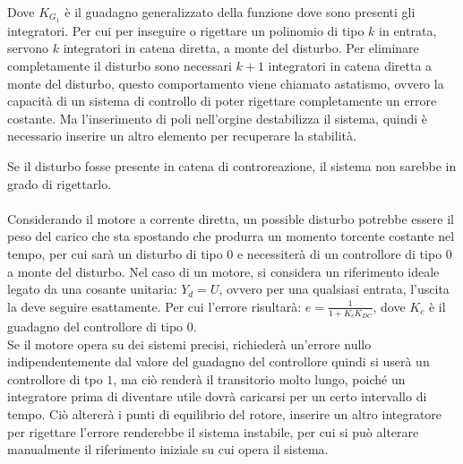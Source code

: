 \documentclass{article}
\numberwithin{equation}{subsection}
\begin{document}
Dove $K_{G_1}$ è il guadagno generalizzato della funzione dove sono presenti gli integratori. 
Per cui per inseguire o rigettare un polinomio di tipo $k$ in entrata, servono $k$ integratori in catena diretta, a monte del disturbo. 
Per eliminare completamente il disturbo sono necessari $k+1$ integratori in catena diretta a monte del disturbo, questo comportamento viene chiamato astatismo, ovvero 
la capacità di un sistema di controllo di poter rigettare completamente un errore costante. Ma l'inserimento di poli nell'orgine 
destabilizza il sistema, quindi è necessario inserire un altro elemento per recuperare la stabilità. 

Se il disturbo fosse presente in catena di controreazione, il sistema non sarebbe in grado di rigettarlo. 
\\
\\
Considerando il motore a corrente diretta, un possible disturbo potrebbe essere il peso del carico che sta spostando che produrra un momento torcente costante nel tempo, 
per cui sarà un disturbo di tipo $0$ e necessiterà di un controllore di tipo $0$ a monte del disturbo. Nel caso di un motore, si considera un riferimento ideale legato da 
una cosante unitaria: $Y_d=U$, ovvero per una qualsiasi entrata, l'uscita la deve seguire esattamente. Per cui l'errore risultarà: $e=\displaystyle\frac{1}{1+K_cK_{DC}}$, 
dove $K_c$ è il guadagno del controllore di tipo $0$. 
\\
Se il motore opera su dei sistemi precisi, richiederà un'errore nullo 
indipendentemente dal valore del guadagno del controllore quindi si userà un controllore di tpo $1$, ma ciò renderà il transitorio molto lungo, poiché un integratore 
prima di diventare utile dovrà caricarsi per un certo intervallo di tempo. Ciò altererà i punti di equilibrio del rotore, inserire un 
altro integratore per rigettare l'errore renderebbe il sistema instabile, per cui si può alterare manualmente il riferimento iniziale su cui opera il sistema. 
\end{document}

